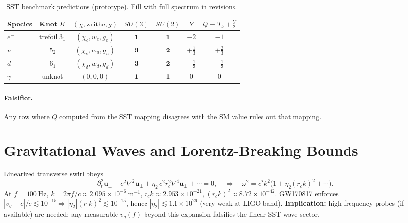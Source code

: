 \documentclass[10pt,reprint,aps,onecolumn,nofootinbib]{revtex4-2}
\newcommand{\rc}{r_c}                                    %
\begin{document}
    \begin{table}[h]
    \centering
    \caption{SST benchmark predictions (prototype). Fill with full spectrum in revisions.}
    \begin{tabular}{lcccccc}
    \hline
    Species & Knot $K$ & $(\chi,\text{writhe},g)$ & $SU(3)$ & $SU(2)$ & $Y$ & $Q=T_3+\tfrac{Y}{2}$\\
    \hline
    $e^-$ & trefoil $3_1$ & $(\chi_e, w_e, g_e)$ & $\mathbf{1}$ & $\mathbf{1}$ & $-2$ & $-1$\\
    $u$ & $5_2$ & $(\chi_u, w_u, g_u)$ & $\mathbf{3}$ & $\mathbf{2}$ & $+\tfrac{1}{3}$ & $+\tfrac{2}{3}$\\
    $d$ & $6_1$ & $(\chi_d, w_d, g_d)$ & $\mathbf{3}$ & $\mathbf{2}$ & $-\tfrac{1}{3}$ & $-\tfrac{1}{3}$\\
    $\gamma$ & unknot & $(0,0,0)$ & $\mathbf{1}$ & $\mathbf{1}$ & $0$ & $0$\\
    \hline
    \end{tabular}
    \end{table}

    \paragraph{Falsifier.} Any row where $Q$ computed from the SST mapping disagrees with the SM value rules out that mapping.

    \section{Gravitational Waves and Lorentz-Breaking Bounds}
    \label{sec:SST-GW}

    Linearized transverse swirl obeys
    \[
        \partial_t^2 \mathbf{u}_\perp - c^2 \nabla^2 \mathbf{u}_\perp
        + \eta_2\,c^2\rc^2\nabla^4 \mathbf{u}_\perp + \cdots = 0,
        \quad\Rightarrow\quad
        \omega^2=c^2k^2\big(1+\eta_2(\rc k)^2+\cdots\big).
    \]
    At \(f=100\ \mathrm{Hz}\), \(k=2\pi f/c\approx 2.095\times10^{-6}\ \mathrm{m^{-1}}\),
    \(\rc k\approx 2.953\times10^{-21}\), \((\rc k)^2\approx 8.72\times10^{-42}\).
    GW170817 enforces \(|v_g-c|/c\lesssim10^{-15}\Rightarrow |\eta_2|(\rc k)^2\lesssim10^{-15}\),
    hence \(|\eta_2|\lesssim 1.1\times10^{26}\) (very weak at LIGO band).
    \textbf{Implication:} high-frequency probes (if available) are needed; any measurable \(v_g(f)\) beyond this expansion falsifies the linear SST wave sector.
\end{document}

